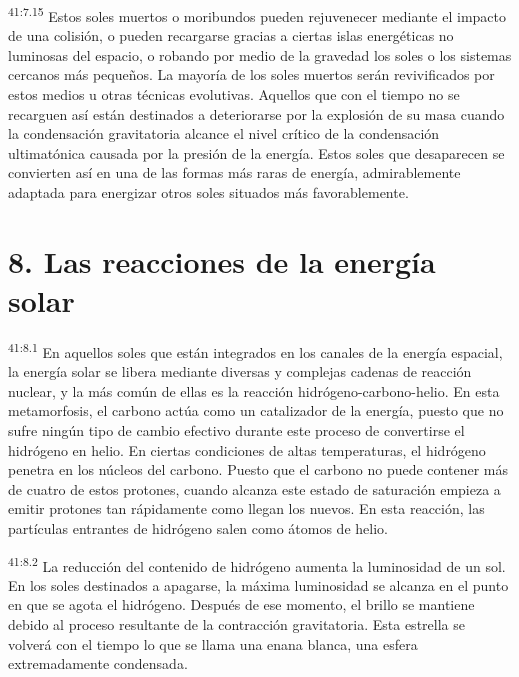 \par
\textsuperscript{41:7.15} Estos soles muertos o moribundos pueden rejuvenecer mediante el impacto de una colisión, o pueden recargarse gracias a ciertas islas energéticas no luminosas del espacio, o robando por medio de la gravedad los soles o los sistemas cercanos más pequeños. La mayoría de los soles muertos serán revivificados por estos medios u otras técnicas evolutivas. Aquellos que con el tiempo no se recarguen así están destinados a deteriorarse por la explosión de su masa cuando la condensación gravitatoria alcance el nivel crítico de la condensación ultimatónica causada por la presión de la energía. Estos soles que desaparecen se convierten así en una de las formas más raras de energía, admirablemente adaptada para energizar otros soles situados más favorablemente.

\section*{8. Las reacciones de la energía solar}
\par
\textsuperscript{41:8.1} En aquellos soles que están integrados en los canales de la energía espacial, la energía solar se libera mediante diversas y complejas cadenas de reacción nuclear, y la más común de ellas es la reacción hidrógeno-carbono-helio. En esta metamorfosis, el carbono actúa como un catalizador de la energía, puesto que no sufre ningún tipo de cambio efectivo durante este proceso de convertirse el hidrógeno en helio. En ciertas condiciones de altas temperaturas, el hidrógeno penetra en los núcleos del carbono. Puesto que el carbono no puede contener más de cuatro de estos protones, cuando alcanza este estado de saturación empieza a emitir protones tan rápidamente como llegan los nuevos. En esta reacción, las partículas entrantes de hidrógeno salen como átomos de helio.

\par
\textsuperscript{41:8.2} La reducción del contenido de hidrógeno aumenta la luminosidad de un sol. En los soles destinados a apagarse, la máxima luminosidad se alcanza en el punto en que se agota el hidrógeno. Después de ese momento, el brillo se mantiene debido al proceso resultante de la contracción gravitatoria. Esta estrella se volverá con el tiempo lo que se llama una enana blanca, una esfera extremadamente condensada.

